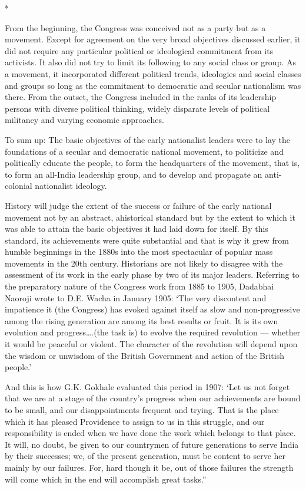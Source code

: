 \begin{center}*\end{center}



From the beginning, the Congress was conceived not as a party but as a movement. Except for agreement on the very broad objectives discussed earlier, it did not require any particular political or ideological commitment from its activists. It also did not try to limit its following to any social class or group. As a movement, it incorporated different political trends, ideologies and social classes and groups so long as the commitment to democratic and secular nationalism was there. From the outset, the Congress included in the ranks of its leadership persons with diverse political thinking, widely disparate levels of political militancy and varying economic approaches.

To sum up: The basic objectives of the early nationalist leaders were to lay the foundations of a secular and democratic national movement, to politicize and politically educate the people, to form the headquarters of the movement, that is, to form an all-India leadership group, and to develop and propagate an anti-colonial nationalist ideology.

History will judge the extent of the success or failure of the early national movement not by an abstract, ahistorical standard but by the extent to which it was able to attain the basic objectives it had laid down for itself. By this standard, its achievements were quite substantial and that is why it grew from humble beginnings in the 1880s into the most spectacular of popular mass movements in the 20th century. Historians are not likely to disagree with the assessment of its work in the early phase by two of its major leaders. Referring to the preparatory nature of the Congress work from 1885 to 1905, Dadabhai Naoroji wrote to D.E. Wacha in January 1905: ‘The very discontent and impatience it (the Congress) has evoked against itself as slow and non-progressive among the rising generation are among its best results or fruit. It is its own evolution and progress….(the task is) to evolve the required revolution — whether it would be peaceful or violent. The character of the revolution will depend upon the wisdom or unwisdom of the British Government and action of the British people.’

And this is how G.K. Gokhale evaluated this period in 1907: ‘Let us not forget that we are at a stage of the country’s progress when our achievements are bound to be small, and our disappointments frequent and trying. That is the place which it has pleased Providence to assign to us in this struggle, and our responsibility is ended when we have done the work which belongs to that place. It will, no doubt, be given to our countrymen of future generations to serve India by their successes; we, of the present generation, must be content to serve her mainly by our failures. For, hard though it be, out of those failures the strength will come which in the end will accomplish great tasks.”

